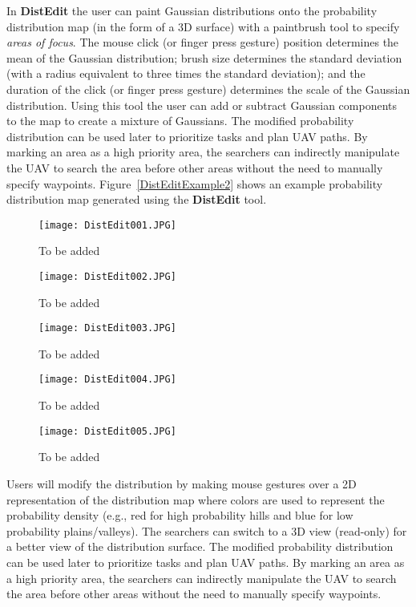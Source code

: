 In \textbf{DistEdit} the user can paint Gaussian distributions onto the probability distribution map (in the form of a 3D surface) with a paintbrush tool to specify \textit{areas of focus}. The mouse click (or finger press gesture) position determines the mean of the Gaussian distribution; brush size determines the standard deviation (with a radius equivalent to three times the standard deviation); and the duration of the click (or finger press gesture) determines the scale of the Gaussian distribution. Using this tool the user can add or subtract Gaussian components to the map to create a mixture of Gaussians. The modified probability distribution can be used later to prioritize tasks and plan UAV paths. By marking an area as a high priority area, the searchers can indirectly manipulate the UAV to search the area before other areas without the need to manually specify waypoints. Figure~\ref{DistEditExample2} shows an example probability distribution map generated using the \textbf{DistEdit} tool.


\begin{figure}
\centering
\texttt{[image: DistEdit001.JPG]}
\caption{To be added}
\label{DistEdit001}
\end{figure}

\begin{figure}
\centering
\texttt{[image: DistEdit002.JPG]}
\caption{To be added}
\label{DistEdit002}
\end{figure}

\begin{figure}
\centering
\texttt{[image: DistEdit003.JPG]}
\caption{To be added}
\label{DistEdit003}
\end{figure}

\begin{figure}
\centering
\texttt{[image: DistEdit004.JPG]}
\caption{To be added}
\label{DistEdit004}
\end{figure}

\begin{figure}
\centering
\texttt{[image: DistEdit005.JPG]}
\caption{To be added}
\label{DistEdit005}
\end{figure}



Users will modify the distribution by making mouse gestures over a 2D representation of the distribution map where colors are used to represent the probability density (e.g., red for high probability hills and blue for low probability plains/valleys). The searchers can switch to a 3D view (read-only) for a better view of the distribution surface. The modified probability distribution can be used later to prioritize tasks and plan UAV paths. By marking an area as a high priority area, the searchers can indirectly manipulate the UAV to search the area before other areas without the need to manually specify waypoints. 



